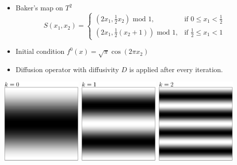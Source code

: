 \documentclass[12pt,t]{beamer}
\begin{document}
\begin{frame}
  \begin{itemize}
  \item Baker's map on $T^2$
    \begin{equation*}
      S(x_1,x_2) =
      \begin{cases}
        (2x_1,\frac{1}{2}x_2) \text{ mod } 1,
        & \text{if } 0 \le x_1 < \frac{1}{2} \\
        (2x_1,\frac{1}{2}(x_2+1)) \text{ mod } 1,
        & \text{if } \frac{1}{2} \le x_1 < 1
      \end{cases}
    \end{equation*}
  \item Initial condition $f^0(x)= \sqrt{\pi} \cos(2 \pi x_2)$
  \item Diffusion operator with diffusivity $D$ is applied after every
    iteration.
  \end{itemize}
  \begin{center}
    \includegraphics[width=0.3\textwidth,trim=1.2cm 1.2cm 1.2cm 1.2cm]{baker1}
    \includegraphics[width=0.3\textwidth,trim=1.2cm 1.2cm 1.2cm 1.2cm]{baker2}
    \includegraphics[width=0.3\textwidth,trim=1.2cm 1.2cm 1.2cm 1.2cm]{baker3}
  \end{center}
\end{frame}
\end{document}
